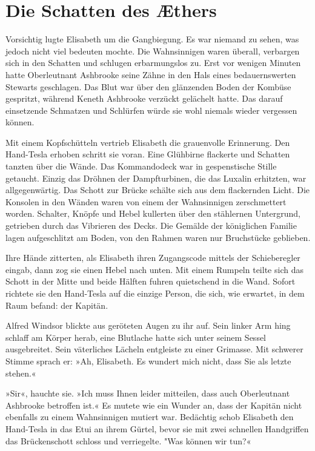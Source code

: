 \section{Die Schatten des Æthers}
Vorsichtig lugte Elisabeth um die Gangbiegung. Es war niemand zu
sehen, was jedoch nicht viel bedeuten mochte. Die Wahnsinnigen
waren überall, verbargen sich in den Schatten und schlugen
erbarmungslos zu. Erst vor wenigen Minuten hatte Oberleutnant
Ashbrooke seine Zähne in den Hals eines bedauernswerten Stewarts
geschlagen. Das Blut war über den glänzenden Boden der Kombüse
gespritzt, während Keneth Ashbrooke verzückt gelächelt hatte. Das
darauf einsetzende Schmatzen und Schlürfen würde sie wohl niemals
wieder vergessen können.

\bigpar

Mit einem Kopfschütteln vertrieb Elisabeth die grauenvolle
Erinnerung. Den Hand-Tesla erhoben schritt sie voran. Eine
Glühbirne flackerte und Schatten tanzten über die Wände. Das
Kommandodeck war in gespenstische Stille getaucht. Einzig das
Dröhnen der Dampfturbinen, die das Luxalin erhitzten, war
allgegenwärtig. Das Schott zur Brücke schälte sich aus dem
flackernden Licht. Die Konsolen in den Wänden waren von einem der
Wahnsinnigen zerschmettert worden. Schalter, Knöpfe und Hebel
kullerten über den stählernen Untergrund, getrieben durch das
Vibrieren des Decks. Die Gemälde der königlichen Familie lagen
aufgeschlitzt am Boden, von den Rahmen waren nur Bruchstücke
geblieben.

Ihre Hände zitterten, als Elisabeth ihren Zugangscode mittels der
Schieberegler eingab, dann zog sie einen Hebel nach unten. Mit
einem Rumpeln teilte sich das Schott in der Mitte und beide Hälften
fuhren quietschend in die Wand. Sofort richtete sie den Hand-Tesla
auf die einzige Person, die sich, wie erwartet, in dem Raum befand:
der Kapitän.

\bigpar

Alfred Windsor blickte aus geröteten Augen zu ihr auf. Sein linker
Arm hing schlaff am Körper herab, eine Blutlache hatte sich unter
seinem Sessel ausgebreitet. Sein väterliches Lächeln entgleiste zu
einer Grimasse. Mit schwerer Stimme sprach er: »Ah, Elisabeth. Es
wundert mich nicht, dass Sie als letzte stehen.«

»Sir«, hauchte sie. »Ich muss Ihnen leider mitteilen, dass auch
Oberleutnant Ashbrooke betroffen ist.« Es mutete wie ein Wunder an,
dass der Kapitän nicht ebenfalls zu einem Wahnsinnigen mutiert war.
Bedächtig schob Elisabeth den Hand-Tesla in das Etui an ihrem
Gürtel, bevor sie mit zwei schnellen Handgriffen das Brückenschott
schloss und verriegelte. "Was können wir tun?«

